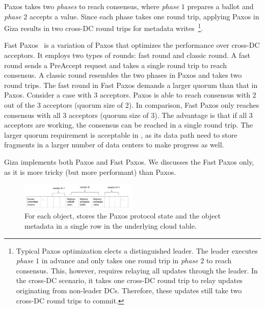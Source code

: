 Paxos takes two {\em phases} to reach consensus, where {\em phase} $1$ prepares
a ballot and {\em phase} $2$ accepts a value. Since each phase takes one round
trip, applying Paxos in Giza results in two cross-DC round trips for metadata
writes~\footnote{Typical Paxos optimization elects a distinguished leader. The
  leader executes {\em phase} $1$ in advance and only takes one round trip in
  {\em phase} $2$ to reach consensus. This, however, requires relaying all
  updates through the leader. In the cross-DC scenario, it takes one cross-DC
  round trip to relay updates originating from non-leader DCs. Therefore, these
  updates still take two cross-DC round trips to commit.}.

Fast Paxos~\cite{lamport05fast} is a variation of Paxos that optimizes the
performance over cross-DC acceptors. It employs two types of rounds: fast round
and classic round. A fast round sends a PreAccept request and takes a single
round trip to reach consensus. A classic round resembles the two phases in Paxos
and takes two round trips. The fast round in Fast Paxos demands a larger quorum
than that in Paxos. Consider a case with $3$ acceptors. Paxos is able to reach
consensus with 2 out of the 3 acceptors (quorum size of 2). In comparison, Fast
Paxos only reaches consensus with all 3 acceptors (quorum size of 3). The
advantage is that if all 3 acceptors are working, the consensus can be reached
in a single round trip. The larger quorum requirement is acceptable in \name, as
its data path need to store fragments in a larger number of data centers to make
progress as well.


Giza implements both Paxos and Fast Paxos. We discusses the Fast Paxos only, as
it is more tricky (but more performant) than Paxos.

\begin{figure}[tp]
\centering
\includegraphics[width=0.5\textwidth]{fig/Giza_Metadata}
\caption{For each object, \name stores the Paxos protocol state and the object metadata 
in a single row in the underlying cloud table.\label{fig:metadataschema}}
\end{figure}

